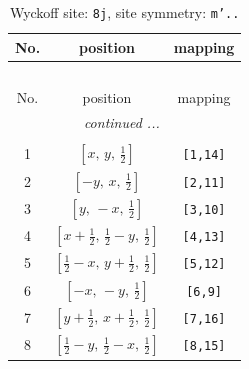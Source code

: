 \documentclass[fleqn,8pt]{jsarticle}
\begin{document}
\begin{longtable}{ccc}
\caption{Wyckoff site: {\tt 8j}, site symmetry: {\tt m'..}}
 \\
 \hline \hline
No. & position & mapping \\ \hline \endfirsthead

\multicolumn{2}{l}{\tablename\ \thetable{}} \\
 \hline \hline
No. & position & mapping \\ \hline \endhead

 \hline \hline
\multicolumn{2}{r}{\footnotesize\it continued ...} \\ \endfoot

 \hline \hline
\multicolumn{2}{r}{} \\ \endlastfoot

1 & $\left[ x,\, y,\, \frac{1}{2} \right]$ & {\tt [1,14]} \\ \hline
2 & $\left[ - y,\, x,\, \frac{1}{2} \right]$ & {\tt [2,11]} \\ \hline
3 & $\left[ y,\, - x,\, \frac{1}{2} \right]$ & {\tt [3,10]} \\ \hline
4 & $\left[ x + \frac{1}{2},\, \frac{1}{2} - y,\, \frac{1}{2} \right]$ & {\tt [4,13]} \\ \hline
5 & $\left[ \frac{1}{2} - x,\, y + \frac{1}{2},\, \frac{1}{2} \right]$ & {\tt [5,12]} \\ \hline
6 & $\left[ - x,\, - y,\, \frac{1}{2} \right]$ & {\tt [6,9]} \\ \hline
7 & $\left[ y + \frac{1}{2},\, x + \frac{1}{2},\, \frac{1}{2} \right]$ & {\tt [7,16]} \\ \hline
8 & $\left[ \frac{1}{2} - y,\, \frac{1}{2} - x,\, \frac{1}{2} \right]$ & {\tt [8,15]} \\
\end{longtable}
\renewcommand{\arraystretch}{1.2}
\end{document}
